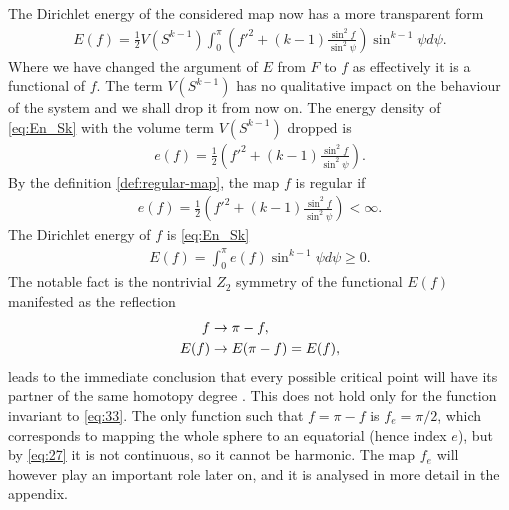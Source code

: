 The Dirichlet energy of the considered map now has a more transparent
form
\begin{align}
  \label{eq:En_Sk}
  E(f)=\frac{1}{2} V(S^{k-1})\int_{0}^{\pi}
  \left(f'^2+(k-1)\frac{\sin^2f}{\sin^2\psi}\right) \sin^{k-1}\psi
  d\psi.
\end{align}
Where we have changed the argument of $E$ from $F$ to $f$ as
effectively it is a functional of $f$. The term $V(S^{k-1})$ has no
qualitative impact on the behaviour of the system and we shall drop it
from now on. The energy density of \eqref{eq:En_Sk} with the volume
term $V(S^{k-1})$ dropped is
\begin{align}
  \label{eq:35}
  e(f)=\frac{1}{2}\left(f'^2+(k-1)\frac{\sin^2f}{\sin^2\psi}\right).
\end{align}
By the definition \ref{def:regular-map}, the map $f$ is regular if
\begin{align}
  \label{eq:38}
  e(f)=\frac{1}{2}\left(f'^2+(k-1)\frac{\sin^2f}{\sin^2\psi}\right)<\infty.
\end{align}
The Dirichlet energy of $f$ is
\eqref{eq:En_Sk}
\begin{align}
  \label{eq:36}
  E(f)=\int_0^\pi e(f)\sin^{k-1}\psi d\psi\ge0.
\end{align}
The notable fact is the nontrivial $Z_2$ symmetry of the
functional $E(f)$ manifested as the reflection
\begin{align}
  \label{eq:33}
  f&\rightarrow\pi-f,\\
  E(f)&\rightarrow E(\pi-f)=E(f),
\end{align}
leads to the immediate conclusion that every possible critical point
will have its partner of the same homotopy degree%
. This does not hold only for the function invariant to
\eqref{eq:33}. The only function such that $f=\pi-f$ is $f_e=\pi/2$,
which corresponds to mapping the whole sphere to an equatorial (hence
index $e$), but by \eqref{eq:27} it is not continuous, so it cannot be
harmonic. The map $f_e$ will however play an important role
later on, and it is analysed in more detail in the appendix.\\

